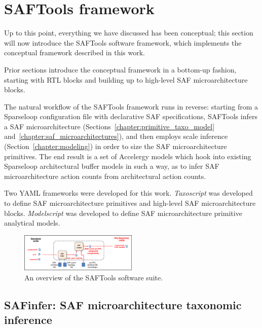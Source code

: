 \chapter{SAFTools framework}
\label{chapter:framework}


Up to this point, everything we have discussed has been conceptual; this section will now introduce the SAFTools software framework, which implements the conceptual framework described in this work.

Prior sections introduce the conceptual framework in a bottom-up fashion, starting with RTL blocks and building up to high-level SAF microarchitecture blocks.

The natural workflow of the SAFTools framework runs in reverse: starting from a Sparseloop configuration file with declarative SAF specifications, SAFTools infers a SAF microarchitecture (Sections~\ref{chapter:primitive_taxo_model} and~\ref{chapter:saf_microarchitectures}), and then employs scale inference (Section~\ref{chapter:modeling}) in order to size the SAF microarchitecture primitives. The end result is a set of Accelergy models which hook into existing Sparseloop architectural buffer models in such a way, as to infer SAF microarchitecture action counts from architectural action counts.

Two YAML frameworks were developed for this work. \textit{Taxoscript} was developed to define SAF microarchitecture primitives and high-level SAF microarchitecture blocks. \textit{Modelscript} was developed to define SAF microarchitecture primitive analytical models.

\begin{figure}[H]
\centering
\includegraphics[width=0.5\textwidth]{figures/saftools_overview.pdf}
\caption{An overview of the SAFTools software suite.}
\label{fig:saftools_overview}
\end{figure}

\section{SAFinfer: SAF microarchitecture taxonomic inference}

